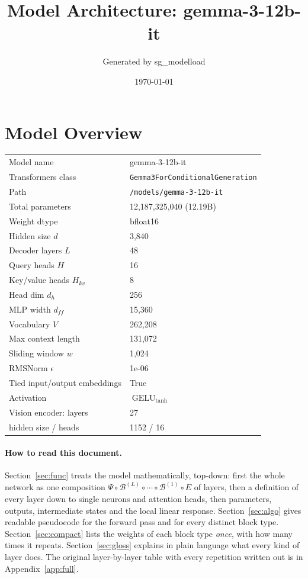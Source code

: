 \documentclass[10pt,a4paper]{article}
\title{Model Architecture: gemma-3-12b-it}
\author{Generated by sg\_modelload}
\date{\today}
\newcommand{\op}[1]{\operatorname{#1}}
\theoremstyle{definition}
\begin{document}
\maketitle
\tableofcontents
\clearpage
\section{Model Overview}
\begin{tabular}{ll}
\toprule
Model name & gemma-3-12b-it \\
Transformers class & \texttt{Gemma3ForConditionalGeneration} \\
Path & \texttt{/models/gemma-3-12b-it} \\
Total parameters & 12,187,325,040 (12.19B) \\
Weight dtype & bfloat16 \\
\midrule
Hidden size $d$ & 3,840 \\
Decoder layers $L$ & 48 \\
Query heads $H$ & 16 \\
Key/value heads $H_{kv}$ & 8 \\
Head dim $d_h$ & 256 \\
MLP width $d_{ff}$ & 15,360 \\
Vocabulary $V$ & 262,208 \\
Max context length & 131,072 \\
Sliding window $w$ & 1,024 \\
RMSNorm $\epsilon$ & 1e-06 \\
Tied input/output embeddings & True \\
Activation & $\op{GELU}_{\tanh}$ \\
\midrule
Vision encoder: layers & 27 \\
\quad hidden size / heads & 1152 / 16 \\
\bottomrule
\end{tabular}

\paragraph{How to read this document.} Section~\ref{sec:func} treats the model mathematically, top-down: first the whole network as one composition $\Psi\circ\mathcal{B}^{(L)}\circ\cdots\circ\mathcal{B}^{(1)}\circ E$ of layers, then a definition of every layer down to single neurons and attention heads, then parameters, outputs, intermediate states and the local linear response. Section~\ref{sec:algo} gives readable pseudocode for the forward pass and for every distinct block type. Section~\ref{sec:compact} lists the weights of each block type \emph{once}, with how many times it repeats. Section~\ref{sec:gloss} explains in plain language what every kind of layer does. The original layer-by-layer table with every repetition written out is in Appendix~\ref{app:full}.
\end{document}
